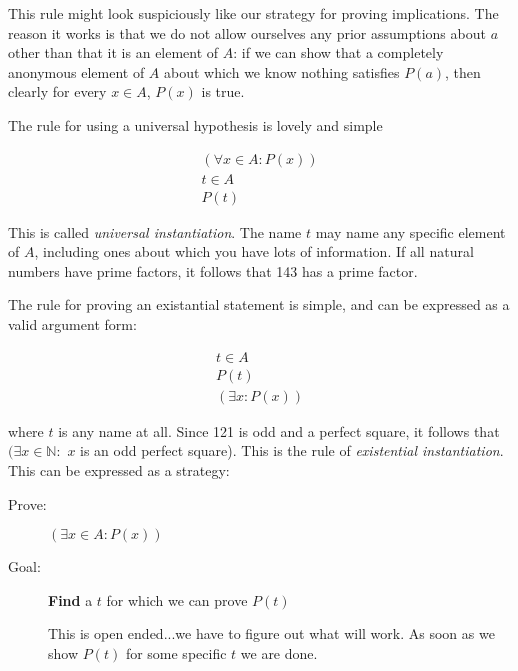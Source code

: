 \documentclass[12pt]{article}
\begin{document}
This rule might look suspiciously like our strategy for proving implications.  The reason it works is that we do not allow ourselves any prior assumptions about $a$ other than that it is an element of $A$:  if we can show that a completely anonymous element of $A$ about which we know nothing satisfies $P(a)$, then clearly for every $x\in A$, $P(x)$ is true.

The rule for using a universal hypothesis is lovely and simple

$$\begin{array}{c}

(\forall x \in A:P(x)) \\

t \in A \\ \hline

P(t)
\end{array}$$

This is called {\em universal instantiation\/}.  The name $t$ may name any specific element of $A$, including ones about which you have lots of information.  If all natural numbers have prime factors, it follows that 143 has a prime factor.

The rule for proving an existantial statement is simple, and can be expressed as a valid argument form:

$$\begin{array}{c}

t \in A \\

P(t) \\ \hline

(\exists x:P(x))
\end{array}$$

where $t$ is any name at all.  Since 121 is odd and a perfect square, it follows that $(\exists x \in {\mathbb N}:$  $x$ is an odd perfect square).  This is the rule of {\em existential instantiation\/}.
\newpage
This can be expressed as a strategy:

\begin{description}
\item[Prove:] $(\exists x \in A:P(x))$

\item[Goal:]  {\bf Find} a $t$ for which we can prove $P(t)$

This is open ended...we have to figure out what will work.  As soon as we show $P(t)$ for some specific $t$ we are done.

\end{description}
\end{document}
